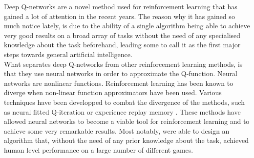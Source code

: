 Deep Q-networks\cite{mnih2013playing} are a novel method used for reinforcement learning that has gained a lot of attention in the recent years. The reason why it has gained so much notice lately, is due to the ability of a single algorithm being able to achieve very good results on a broad array of tasks without the need of any specialised knowledge about the task beforehand, leading some to call it as the first major steps towards general artificial intelligence.\\
What separates deep Q-networks from other reinforcement learning methods, is that they use neural networks in order to approximate the Q-function. Neural networks are nonlinear functions. Reinforcement learning has been known to diverge when non-linear function approximators have been used. Various techniques have been developped to combat the divergence of the methods, such as neural fitted Q-iteration \cite{riedmiller2005neural} or experience replay memory \cite{Mnih2015}. These methods have allowed neural networks to become a viable tool for reinforcement learning and to achieve some very remarkable results. Most notably, \cite{Mnih2015} were able to design an algorithm that, without the need of any prior knowledge about the task, achieved human level performance on a large number of different games.

































